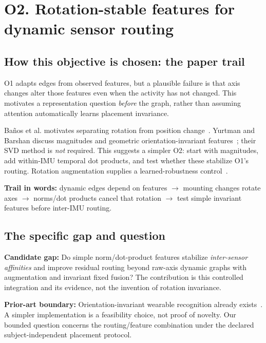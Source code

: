 \documentclass[10pt]{article}
\begin{document}
\clearpage
\section*{O2. Rotation-stable features for dynamic sensor routing}
\subsection*{How this objective is chosen: the paper trail}
O1 adapts edges from observed features, but a plausible failure is that axis changes alter those features even when the activity has not changed. This motivates a representation question \emph{before} the graph, rather than assuming attention automatically learns placement invariance.

Ba\~nos et al. motivates separating rotation from position change~\cite{ombanos}. Yurtman and Barshan discuss magnitudes and geometric orientation-invariant features~\cite{omyurtman}; their SVD method is \emph{not} required. This suggests a simpler O2: start with magnitudes, add within-IMU temporal dot products, and test whether these stabilize O1's routing. Rotation augmentation supplies a learned-robustness control~\cite{omum}.

\textbf{Trail in words:} dynamic edges depend on features $\rightarrow$ mounting changes rotate axes $\rightarrow$ norms/dot products cancel that rotation $\rightarrow$ test simple invariant features before inter-IMU routing.

\subsection*{The specific gap and question}
\textbf{Candidate gap:} Do simple norm/dot-product features stabilize \emph{inter-sensor affinities} and improve residual routing beyond raw-axis dynamic graphs with augmentation and invariant fixed fusion? The contribution is this controlled integration and its evidence, not the invention of rotation invariance.

\textbf{Prior-art boundary:} Orientation-invariant wearable recognition already exists~\cite{omyurtman}. A simpler implementation is a feasibility choice, not proof of novelty. Our bounded question concerns the routing/feature combination under the declared subject-independent placement protocol.
\end{document}
